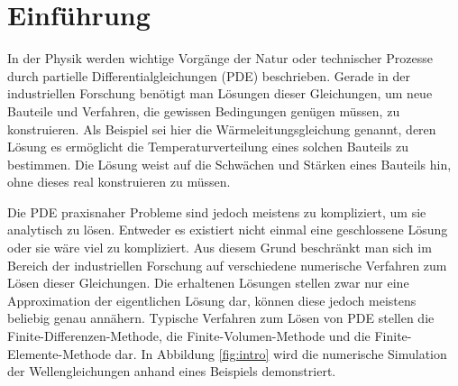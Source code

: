 \documentclass[crop=false]{standalone}
\begin{document}
  \section{Einführung} %
  \label{sec:introduction}

    In der Physik werden wichtige Vorgänge der Natur oder technischer Prozesse durch partielle Differentialgleichungen (PDE) beschrieben.
    Gerade in der industriellen Forschung benötigt man Lösungen dieser Gleichungen, um neue Bauteile und Verfahren, die gewissen Bedingungen genügen müssen, zu konstruieren.
    Als Beispiel sei hier die Wärmeleitungsgleichung genannt, deren Lösung es ermöglicht die Temperaturverteilung eines solchen Bauteils zu bestimmen.
    Die Lösung weist auf die Schwächen und Stärken eines Bauteils hin, ohne dieses real konstruieren zu müssen.

    Die PDE praxisnaher Probleme sind jedoch meistens zu kompliziert, um sie analytisch zu lösen.
    Entweder es existiert nicht einmal eine geschlossene Lösung oder sie wäre viel zu kompliziert.
    Aus diesem Grund beschränkt man sich im Bereich der industriellen Forschung auf verschiedene numerische Verfahren zum Lösen dieser Gleichungen.
    Die erhaltenen Lösungen stellen zwar nur eine Approximation der eigentlichen Lösung dar, können diese jedoch meistens beliebig genau annähern.
    Typische Verfahren zum Lösen von PDE stellen die Finite-Differenzen-Methode, die Finite-Volumen-Methode und die Finite-Elemente-Methode dar.
    In Abbildung \ref{fig:intro} wird die numerische Simulation der Wellengleichungen anhand eines Beispiels demonstriert.
\end{document}
